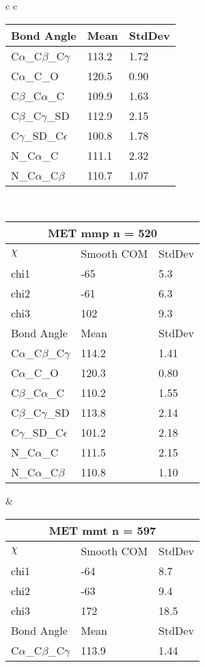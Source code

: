 \begin{longtable}{ c c }
\begin{tabular}{ l l l }
  Bond Angle   & Mean     & StdDev \\ \midrule
  C$\alpha$\_C$\beta$\_C$\gamma$ & 113.2 & 1.72\\
  C$\alpha$\_C\_O & 120.5 & 0.90\\
  C$\beta$\_C$\alpha$\_C & 109.9 & 1.63\\
  C$\beta$\_C$\gamma$\_SD & 112.9 & 2.15\\
  C$\gamma$\_SD\_C$\epsilon$ & 100.8 & 1.78\\
  N\_C$\alpha$\_C & 111.1 & 2.32\\
  N\_C$\alpha$\_C$\beta$ & 110.7 & 1.07\\
  \bottomrule
  \end{tabular}
  \\
  \begin{tabular}{ l l l }
  \toprule
  \multicolumn{3}{c}{MET \textbf{mmp} n = 520} \\ \toprule
  $\chi$       & Smooth COM & StdDev \\ \midrule
  chi1 & -65 & 5.3 \\ 
  chi2 & -61 & 6.3 \\ 
  chi3 & 102 & 9.3 \\ \midrule
  Bond Angle   & Mean     & StdDev \\ \midrule
  C$\alpha$\_C$\beta$\_C$\gamma$ & 114.2 & 1.41\\
  C$\alpha$\_C\_O & 120.3 & 0.80\\
  C$\beta$\_C$\alpha$\_C & 110.2 & 1.55\\
  C$\beta$\_C$\gamma$\_SD & 113.8 & 2.14\\
  C$\gamma$\_SD\_C$\epsilon$ & 101.2 & 2.18\\
  N\_C$\alpha$\_C & 111.5 & 2.15\\
  N\_C$\alpha$\_C$\beta$ & 110.8 & 1.10\\
  \bottomrule
  \end{tabular}
  &
  \begin{tabular}{ l l l }
  \toprule
  \multicolumn{3}{c}{MET \textbf{mmt} n = 597} \\ \toprule
  $\chi$       & Smooth COM & StdDev \\ \midrule
  chi1 & -64 & 8.7 \\ 
  chi2 & -63 & 9.4 \\ 
  chi3 & 172 & 18.5 \\ \midrule
  Bond Angle   & Mean     & StdDev \\ \midrule
  C$\alpha$\_C$\beta$\_C$\gamma$ & 113.9 & 1.44\\

\end{tabular}
\end{longtable}
